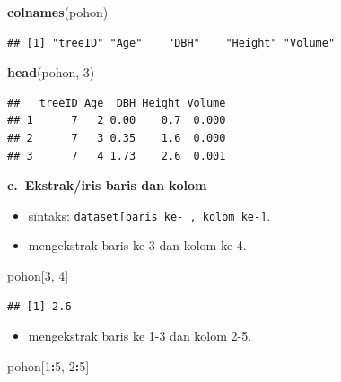 \documentclass[
  12pt,
  a4paper,
]{scrbook}
\newenvironment{Shaded}{\begin{snugshade}}{\end{snugshade}}
\newcommand{\DecValTok}[1]{\textcolor[rgb]{0.00,0.00,0.81}{#1}}
\newcommand{\KeywordTok}[1]{\textcolor[rgb]{0.13,0.29,0.53}{\textbf{#1}}}
\newcommand{\NormalTok}[1]{#1}
\newcommand{\OperatorTok}[1]{\textcolor[rgb]{0.81,0.36,0.00}{\textbf{#1}}}
\providecommand{\tightlist}{%
  \setlength{\itemsep}{0pt}\setlength{\parskip}{0pt}}
\begin{document}
\begin{Shaded}
\begin{Highlighting}[]
\KeywordTok{colnames}\NormalTok{(pohon)}
\end{Highlighting}
\end{Shaded}

\begin{verbatim}
## [1] "treeID" "Age"    "DBH"    "Height" "Volume"
\end{verbatim}

\begin{Shaded}
\begin{Highlighting}[]
\KeywordTok{head}\NormalTok{(pohon, }\DecValTok{3}\NormalTok{)}
\end{Highlighting}
\end{Shaded}

\begin{verbatim}
##   treeID Age  DBH Height Volume
## 1      7   2 0.00    0.7  0.000
## 2      7   3 0.35    1.6  0.000
## 3      7   4 1.73    2.6  0.001
\end{verbatim}

\textbf{c.~Ekstrak/iris baris dan kolom}

\begin{itemize}
\tightlist
\item
  sintaks: \texttt{dataset{[}baris\ ke-\ ,\ kolom\ ke-{]}}.
\item
  mengekstrak baris ke-3 dan kolom ke-4.
\end{itemize}

\begin{Shaded}
\begin{Highlighting}[]
\NormalTok{pohon[}\DecValTok{3}\NormalTok{, }\DecValTok{4}\NormalTok{]}
\end{Highlighting}
\end{Shaded}

\begin{verbatim}
## [1] 2.6
\end{verbatim}

\begin{itemize}
\tightlist
\item
  mengekstrak baris ke 1-3 dan kolom 2-5.
\end{itemize}

\begin{Shaded}
\begin{Highlighting}[]
\NormalTok{pohon[}\DecValTok{1}\OperatorTok{:}\DecValTok{5}\NormalTok{, }\DecValTok{2}\OperatorTok{:}\DecValTok{5}\NormalTok{]}
\end{Highlighting}
\end{Shaded}
\end{document}
